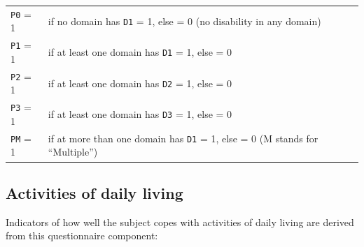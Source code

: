 \documentclass[12pt,a4paper]{book}
\begin{document}
\begin{longtable}[]{@{}ll@{}}
\toprule
\endhead
\begin{minipage}[t]{0.11\columnwidth}\raggedright
\texttt{P0} = 1\strut
\end{minipage} & \begin{minipage}[t]{0.83\columnwidth}\raggedright
if no domain has \texttt{D1} = 1, else = 0 (no disability in any domain)\strut
\end{minipage}\tabularnewline
\begin{minipage}[t]{0.11\columnwidth}\raggedright
\texttt{P1} = 1\strut
\end{minipage} & \begin{minipage}[t]{0.83\columnwidth}\raggedright
if at least one domain has \texttt{D1} = 1, else = 0\strut
\end{minipage}\tabularnewline
\begin{minipage}[t]{0.11\columnwidth}\raggedright
\texttt{P2} = 1\strut
\end{minipage} & \begin{minipage}[t]{0.83\columnwidth}\raggedright
if at least one domain has \texttt{D2} = 1, else = 0\strut
\end{minipage}\tabularnewline
\begin{minipage}[t]{0.11\columnwidth}\raggedright
\texttt{P3} = 1\strut
\end{minipage} & \begin{minipage}[t]{0.83\columnwidth}\raggedright
if at least one domain has \texttt{D3} = 1, else = 0\strut
\end{minipage}\tabularnewline
\begin{minipage}[t]{0.11\columnwidth}\raggedright
\texttt{PM} = 1\strut
\end{minipage} & \begin{minipage}[t]{0.83\columnwidth}\raggedright
if at more than one domain has \texttt{D1} = 1, else = 0 (M stands for ``Multiple'')\strut
\end{minipage}\tabularnewline
\bottomrule
\end{longtable}

\hypertarget{activities-of-daily-living}{%
\subsection{Activities of daily living}\label{activities-of-daily-living}}

Indicators of how well the subject copes with activities of daily living are derived from this questionnaire component:
\end{document}

